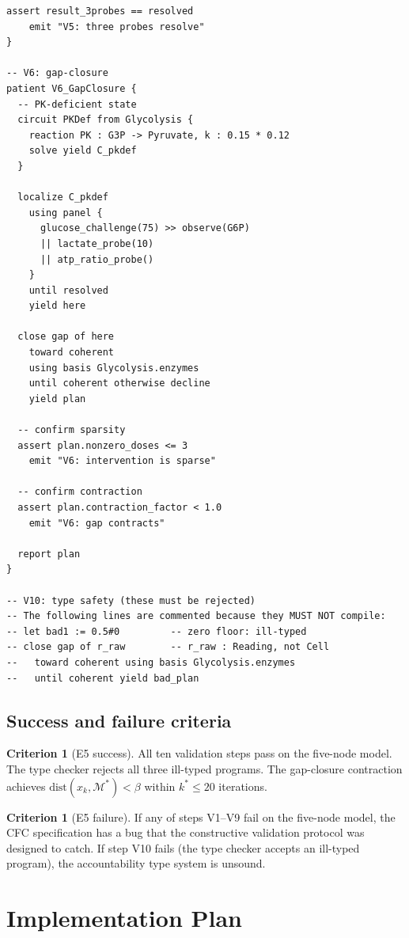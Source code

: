 \documentclass[11pt,a4paper]{article}
\theoremstyle{expthm}
\theoremstyle{definition}
\newtheorem{criterion}[theorem]{Criterion}
\theoremstyle{remark}
\newcommand{\flo}{\beta}
\begin{document}
\begin{lstlisting}[caption={E5: CFC reference implementation.}]
  assert result_3probes == resolved
    emit "V5: three probes resolve"
}

-- V6: gap-closure
patient V6_GapClosure {
  -- PK-deficient state
  circuit PKDef from Glycolysis {
    reaction PK : G3P -> Pyruvate, k : 0.15 * 0.12
    solve yield C_pkdef
  }

  localize C_pkdef
    using panel {
      glucose_challenge(75) >> observe(G6P)
      || lactate_probe(10)
      || atp_ratio_probe()
    }
    until resolved
    yield here

  close gap of here
    toward coherent
    using basis Glycolysis.enzymes
    until coherent otherwise decline
    yield plan

  -- confirm sparsity
  assert plan.nonzero_doses <= 3
    emit "V6: intervention is sparse"

  -- confirm contraction
  assert plan.contraction_factor < 1.0
    emit "V6: gap contracts"

  report plan
}

-- V10: type safety (these must be rejected)
-- The following lines are commented because they MUST NOT compile:
-- let bad1 := 0.5#0         -- zero floor: ill-typed
-- close gap of r_raw        -- r_raw : Reading, not Cell
--   toward coherent using basis Glycolysis.enzymes
--   until coherent yield bad_plan
\end{lstlisting}

\subsection{Success and failure criteria}

\begin{criterion}[E5 success]
All ten validation steps pass on the five-node model. The type checker
rejects all three ill-typed programs. The gap-closure contraction
achieves $\mathrm{dist}(x_k, \mathcal{M}^*) < \flo$ within $k^* \leq 20$
iterations.
\end{criterion}

\begin{criterion}[E5 failure]
If any of steps V1--V9 fail on the five-node model, the CFC specification
has a bug that the constructive validation protocol was designed to catch.
If step V10 fails (the type checker accepts an ill-typed program), the
accountability type system is unsound.
\end{criterion}

\section{Implementation Plan}
\label{sec:implementation}
\end{document}
